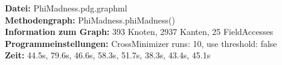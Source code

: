 \textbf{Datei: }PhiMadness.pdg.graphml\\
\textbf{Methodengraph: }PhiMadness.phiMadness()\\
\textbf{Information zum Graph: }393 Knoten, 2937 Kanten, 25 FieldAccesses\\
\textbf{Programmeinstellungen: }CrossMinimizer runs: 10, use threshold: false\\
\textbf{Zeit: }44.5s, 79.6s, 46.6s, 58.3s, 51.7s, 38.3s, 43.4s, 45.1s\\




